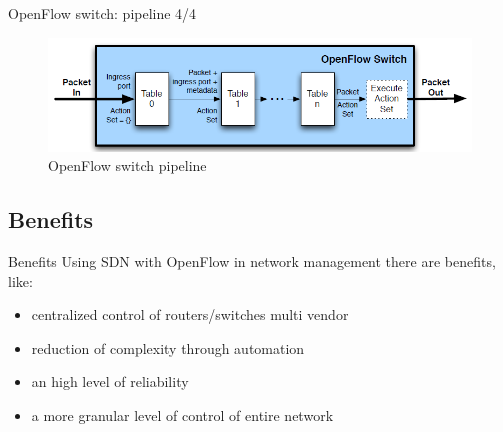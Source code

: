\begin{frame}{OpenFlow switch: \small{pipeline 4/4}}
\begin{figure}
\includegraphics[scale=0.45]{Immagini/OpenFlowPipeline.png}
\caption{OpenFlow switch pipeline}
\label{fig:OpenFlowSwitchPipeline}
\end{figure}
\end{frame}

\subsection{Benefits}
\begin{frame}{Benefits}
Using SDN with OpenFlow in network management there are benefits, like:
\begin{itemize}
\item<2-> centralized control of routers/switches multi vendor
\item<3-> reduction of complexity through automation
\item<4-> an high level of reliability
\item<5-> a more granular level of control of entire network
\end{itemize}
\end{frame}